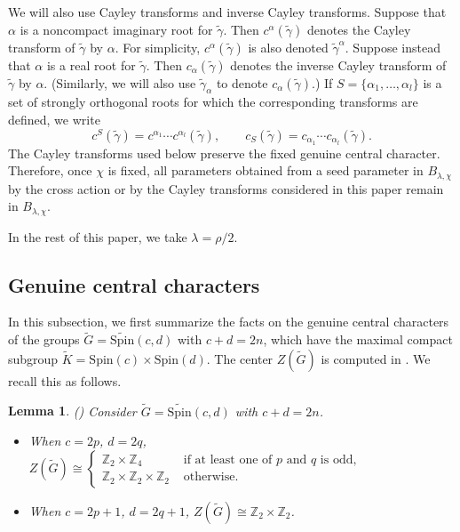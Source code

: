 \documentclass{amsart}
\newcommand{\bbZ}{{\mathbb Z}}
\newcommand{\Spin}{{\mathrm{Spin}}}
\newtheorem{lemma}[thm]{Lemma}
\theoremstyle{definition}
\newcommand{\tu}{\widetilde}
\begin{document}
We will also use Cayley transforms and inverse Cayley transforms. Suppose that $\alpha$ is a noncompact imaginary root for $\tu\gamma$. Then $c^\alpha(\tu\gamma)$ denotes the Cayley transform of $\tu\gamma$ by $\alpha$. For simplicity, $c^{\alpha}(\tu\gamma)$ is also denoted $\tu\gamma^\alpha$.  Suppose instead that $\alpha$ is a real root for $\tu\gamma$. Then $c_\alpha(\tu\gamma)$ denotes the inverse Cayley transform of $\tu \gamma$ by $\alpha$. (Similarly, we will also use $\tu\gamma_\alpha$ to denote $c_\alpha(\tu\gamma)$.) 
If $S=\{\alpha_1,\ldots,\alpha_l\}$ is a set of strongly orthogonal roots for which the corresponding transforms are defined, we write
\begin{equation*}
c^S(\tu\gamma)=c^{\alpha_1}\cdots c^{\alpha_l}(\tu\gamma),
\qquad
c_S(\tu\gamma)=c_{\alpha_1}\cdots c_{\alpha_l}(\tu\gamma).
\end{equation*}
The Cayley transforms used below preserve the fixed genuine central character. Therefore, once $\chi$ is fixed, all parameters obtained from a seed parameter in $B_{\lambda,\chi}$ by the cross action or by the Cayley transforms considered in this paper remain in $B_{\lambda,\chi}$.

In the rest of this paper, we take $\lambda=\rho/2$.



\subsection{Genuine central characters}
\label{s:central-char}
In this subsection, we first summarize the facts on the genuine central characters of the groups $\widetilde{G}=\tu\Spin(c,d)$ with $c+d=2n$, which have the maximal compact subgroup $\tu K = \Spin(c)\times \Spin (d)$. The center $Z(\widetilde{G})$ is computed in \cite{BTs18}. We recall this as follows.

\begin{lemma} \textup{(\cite[Lemma 6.1]{BTs18})} \label{l:center}
Consider $\widetilde{G}=\tu\Spin(c,d)$ with $c+d=2n$. 
\begin{itemize}
    \item[(1)] When $c=2p$, $d=2q$, $Z(\tu G) \cong
    \begin{cases}
\bbZ_2\times\bbZ_4 & \text{ if at least one of $p$ and $q$ is odd},\\
\bbZ_2\times \bbZ_2\times \bbZ_2 &\text{ otherwise}.
    \end{cases}$
    \item[(2)] When $c=2p+1$, $d=2q+1$, $Z(\tu G)\cong \bbZ_2\times \bbZ_2$. 
\end{itemize}

\end{lemma}
\end{document}
